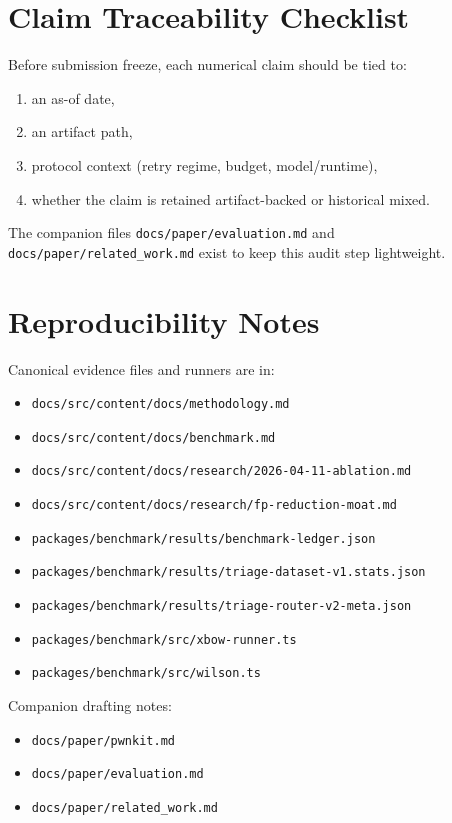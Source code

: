 \documentclass[11pt]{article}
\begin{document}
\section{Claim Traceability Checklist}

Before submission freeze, each numerical claim should be tied to:

\begin{enumerate}[leftmargin=*]
  \item an as-of date,
  \item an artifact path,
  \item protocol context (retry regime, budget, model/runtime),
  \item whether the claim is retained artifact-backed or historical mixed.
\end{enumerate}

The companion files \texttt{docs/paper/evaluation.md} and
\texttt{docs/paper/related\_work.md} exist to keep this audit step lightweight.

\section{Reproducibility Notes}

Canonical evidence files and runners are in:
\begin{itemize}
  \item \texttt{docs/src/content/docs/methodology.md}
  \item \texttt{docs/src/content/docs/benchmark.md}
  \item \texttt{docs/src/content/docs/research/2026-04-11-ablation.md}
  \item \texttt{docs/src/content/docs/research/fp-reduction-moat.md}
  \item \texttt{packages/benchmark/results/benchmark-ledger.json}
  \item \texttt{packages/benchmark/results/triage-dataset-v1.stats.json}
  \item \texttt{packages/benchmark/results/triage-router-v2-meta.json}
  \item \texttt{packages/benchmark/src/xbow-runner.ts}
  \item \texttt{packages/benchmark/src/wilson.ts}
\end{itemize}

Companion drafting notes:

\begin{itemize}
  \item \texttt{docs/paper/pwnkit.md}
  \item \texttt{docs/paper/evaluation.md}
  \item \texttt{docs/paper/related\_work.md}
\end{itemize}
\end{document}
